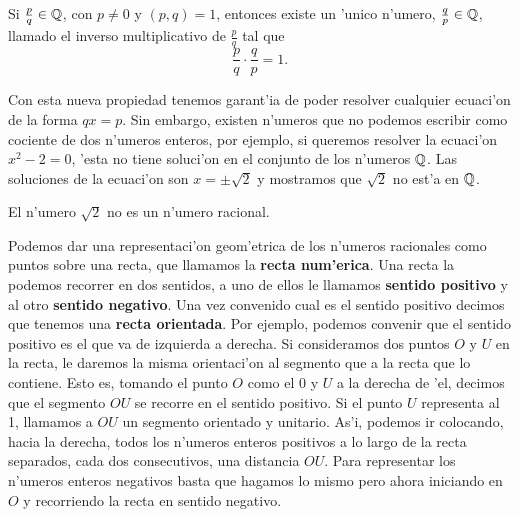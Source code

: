 \begin{propiedad}
Si $\frac{p}{q}\in \mathbb{Q}$, con $p\neq 0$ y $(p,q)=1$, entonces existe un 
'unico n'umero, $\frac{q}{p}\in \mathbb{Q}$, llamado el inverso multiplicativo 
de $\frac{p}{q}$ tal que
$$
               \frac{p}{q}\cdot \frac{q}{p} = 1.
$$
\end{propiedad}


\noindent Con esta nueva propiedad tenemos garant'ia de poder resolver cualquier ecuaci'on de la forma $q x = p$. Sin embargo, existen n'umeros que no podemos escribir como cociente de dos n'umeros enteros, por ejemplo, si queremos resolver la ecuaci'on  $x^2-2=0$, 'esta no tiene soluci'on en el conjunto de los 
n'umeros $\mathbb{Q}$. Las soluciones de la ecuaci'on son 
$x=\pm\sqrt{2}$ y mostramos que $\sqrt{2}$ no est'a en $\mathbb{Q}$.

\begin{proposicion}
El n'umero $\sqrt{2}$ no es un n'umero racional.
\end{proposicion}


Podemos dar una representaci'on geom'etrica de los n'umeros racionales como puntos sobre una recta, que llamamos la 
{\bf recta num'erica}. Una recta la podemos recorrer en dos sentidos, a uno de ellos le llamamos  
{\bf sentido positivo} y al otro {\bf sentido negativo}. Una vez convenido cual es el sentido positivo decimos que tenemos 
una {\bf recta orientada}. Por ejemplo, podemos convenir que el sentido positivo es el que va de 
izquierda a derecha. Si consideramos dos puntos $O$ y $U$ en la recta, le daremos la misma orientaci'on al segmento que a 
la recta que lo contiene. Esto es, tomando el punto $O$ como el 0 y 
$U$  a la derecha de 'el, decimos que el segmento $OU$ se recorre en el sentido positivo. Si el punto $U$ representa al 1, 
llamamos a $OU$ un segmento orientado y unitario. As'i, podemos ir colocando, hacia la derecha, todos los n'umeros enteros 
positivos a lo largo de la recta separados, cada dos consecutivos,  una distancia $OU$. Para representar los n'umeros enteros 
negativos basta que hagamos lo mismo pero ahora iniciando en $O$ y recorriendo la recta en sentido negativo.

